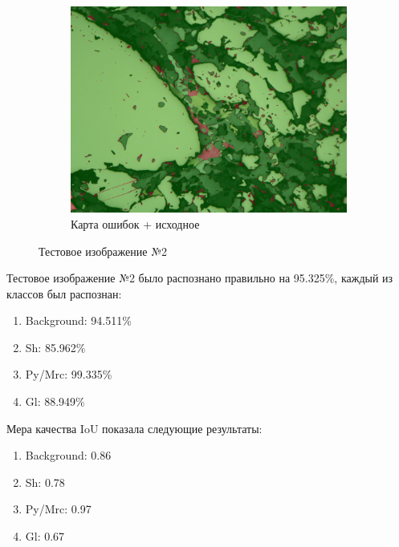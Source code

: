 \begin{figure}[H]
\begin{subfigure}{.33\textwidth}
  \includegraphics[width=.9\linewidth]{pics/image_7_overlay.jpg}
  \caption{Карта ошибок + исходное}
  \label{fig:sfig2_5}
\end{subfigure}
\caption{Тестовое изображение №2}
\label{fig:pred2}
\end{figure}

Тестовое изображение №2 было распознано правильно на 95.325\%, каждый из классов был распознан: \\
\begin{enumerate}[nosep]
    \item Background: 94.511\%
    \item Sh: 85.962\%
    \item Py/Mrc: 99.335\%
    \item Gl: 88.949\%
\end{enumerate}{}
Мера качества IoU показала следующие результаты:
\begin{enumerate}[nosep]
    \item Background: 0.86
    \item Sh: 0.78
    \item Py/Mrc: 0.97
    \item Gl: 0.67
\end{enumerate}{}

